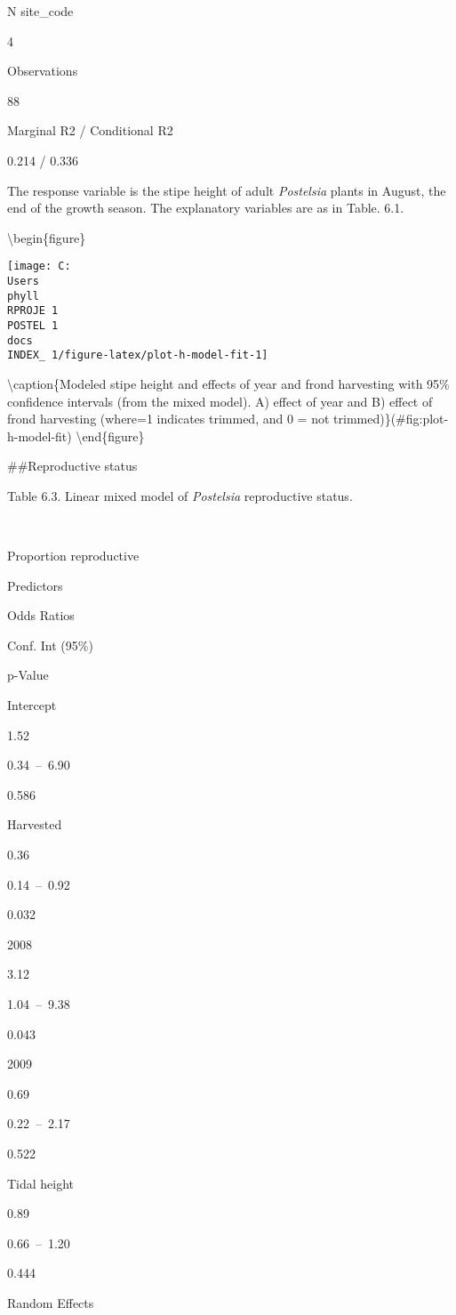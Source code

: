 \documentclass[
]{article}
\begin{document}
N site\_code

4

Observations

88

Marginal R2 / Conditional R2

0.214 / 0.336

The response variable is the stipe height of adult \emph{Postelsia} plants in August, the end of the growth season. The explanatory variables are as in Table. 6.1.

\textbackslash begin\{figure\}

\texttt{[image: C:\\Users\\phyll\\RPROJE~1\\POSTEL~1\\docs\\INDEX\_~1/figure-latex/plot-h-model-fit-1]} \hfill{}

\textbackslash caption\{Modeled stipe height and effects of year and frond harvesting with 95\% confidence intervals (from the mixed model). A) effect of year and B) effect of frond harvesting (where=1 indicates trimmed, and 0 = not trimmed)\}(\#fig:plot-h-model-fit)
\textbackslash end\{figure\}
\newpage

\#\#Reproductive status

Table 6.3. Linear mixed model of \emph{Postelsia} reproductive status.

~

Proportion reproductive

Predictors

Odds Ratios

Conf. Int (95\%)

p-Value

Intercept

1.52

0.34~--~6.90

0.586

Harvested

0.36

0.14~--~0.92

0.032

2008

3.12

1.04~--~9.38

0.043

2009

0.69

0.22~--~2.17

0.522

Tidal height

0.89

0.66~--~1.20

0.444

Random Effects
\end{document}
